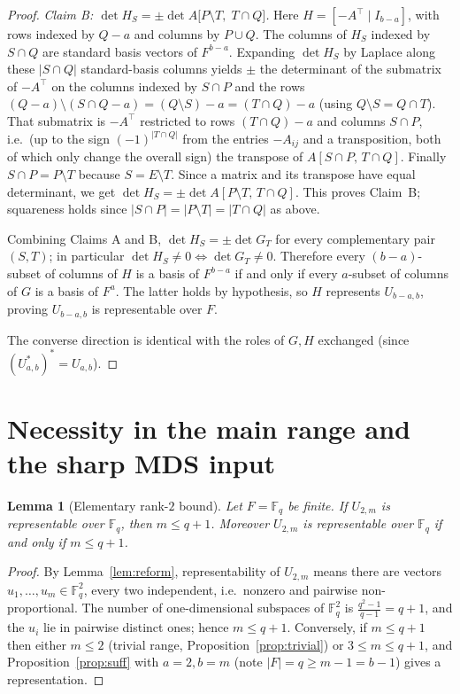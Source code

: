 \documentclass{amsart}
\newtheorem{lemma}{Lemma}
\theoremstyle{definition}
\begin{document}
\begin{proof}
\smallskip\noindent\emph{Claim B: $\det H_S=\pm\det A\bigl[P\setminus T,\;T\cap
Q\bigr]$.} Here $H=[-A^\top\mid I_{b-a}]$, with rows indexed by $Q-a$ and columns
by $P\cup Q$. The columns of $H_S$ indexed by $S\cap Q$ are standard basis
vectors of $F^{b-a}$. Expanding $\det H_S$ by Laplace along these
$|S\cap Q|$ standard-basis columns yields $\pm$ the determinant of the submatrix
of $-A^\top$ on the columns indexed by $S\cap P$ and the rows
$(Q-a)\setminus(S\cap Q-a)=(Q\setminus S)-a=(T\cap Q)-a$ (using $Q\setminus
S=Q\cap T$). That submatrix is $-A^\top$ restricted to rows $(T\cap Q)-a$ and
columns $S\cap P$, i.e.\ (up to the sign $(-1)^{|T\cap Q|}$ from the entries
$-A_{ij}$ and a transposition, both of which only change the overall sign) the
transpose of $A[S\cap P,\,T\cap Q]$. Finally $S\cap P=P\setminus T$ because
$S=E\setminus T$. Since a matrix and its transpose have equal determinant, we get
$\det H_S=\pm\det A[P\setminus T,\,T\cap Q]$. This proves Claim~B; squareness
holds since $|S\cap P|=|P\setminus T|=|T\cap Q|$ as above.

\smallskip
Combining Claims A and B, $\det H_S=\pm\det G_T$ for every complementary pair
$(S,T)$; in particular $\det H_S\ne0\iff\det G_T\ne0$. Therefore every
$(b-a)$-subset of columns of $H$ is a basis of $F^{b-a}$ if and only if every
$a$-subset of columns of $G$ is a basis of $F^a$. The latter holds by hypothesis,
so $H$ represents $U_{b-a,b}$, proving $U_{b-a,b}$ is representable over $F$.

The converse direction is identical
with the roles of $G,H$ exchanged (since $(U_{a,b}^{*})^{*}=U_{a,b}$).
\end{proof}

\section{Necessity in the main range and the sharp MDS input}

\begin{lemma}[Elementary rank-$2$ bound]\label{lem:rank2}
Let $F=\mathbb F_q$ be finite. If $U_{2,m}$ is representable over $\mathbb F_q$,
then $m\le q+1$. Moreover $U_{2,m}$ is representable over $\mathbb F_q$ if and
only if $m\le q+1$.
\end{lemma}

\begin{proof}
By Lemma~\ref{lem:reform}, representability of $U_{2,m}$ means there are vectors
$u_1,\dots,u_m\in\mathbb F_q^{2}$, every two independent, i.e.\ nonzero and
pairwise non-proportional. The number of one-dimensional subspaces of
$\mathbb F_q^2$ is $\tfrac{q^2-1}{q-1}=q+1$, and the $u_i$ lie in pairwise
distinct ones; hence $m\le q+1$. Conversely, if $m\le q+1$ then either $m\le2$
(trivial range, Proposition~\ref{prop:trivial}) or $3\le m\le q+1$, and
Proposition~\ref{prop:suff} with $a=2,b=m$ (note $|F|=q\ge m-1=b-1$) gives a
representation.
\end{proof}
\end{document}
